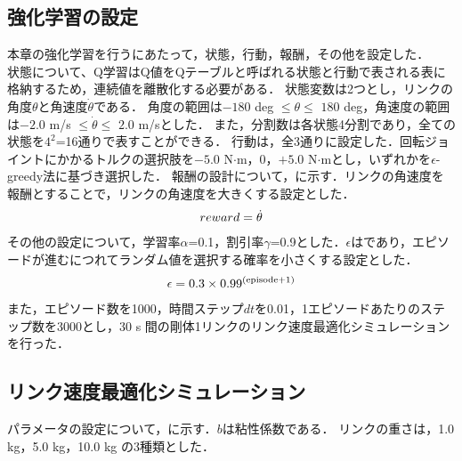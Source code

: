 \begin{small}
\subsection{強化学習の設定}
本章の強化学習を行うにあたって，状態，行動，報酬，その他を設定した．\\
状態について、Q学習はQ値をQテーブルと呼ばれる状態と行動で表される表に格納するため，連続値を離散化する必要がある．
状態変数は2つとし，リンクの角度$\theta$と角速度$\dot{\theta}$である．
角度の範囲は$-180$ deg $\leq \theta \leq$ $180$ deg，角速度の範囲は$-2.0$ m/s $\leq \dot{\theta} \leq$ $2.0$ m/sとした．
また，分割数は各状態4分割であり，全ての状態を$4^{2}$=16通りで表すことができる．
行動は，全3通りに設定した．回転ジョイントにかかるトルクの選択肢を$-5.0$ N$\cdot$m，$0$，$+5.0$ N$\cdot$mとし，いずれかを$\epsilon$-greedy法に基づき選択した．
報酬の設計について，に示す．リンクの角速度を報酬とすることで，リンクの角速度を大きくする設定とした．
\begin{eqnarray}
  \equlabel{3}
  reward = \dot{\theta}
\end{eqnarray}
その他の設定について，学習率$\alpha$=0.1，割引率$\gamma$=0.9とした．$\epsilon$はであり，エピソードが進むにつれてランダム値を選択する確率を小さくする設定とした．
\begin{eqnarray}
  \equlabel{4}
  \epsilon = 0.3 \times 0.99^{(\mathrm{episode} + 1)}
\end{eqnarray}
また，エピソード数を1000，時間ステップ$dt$を0.01，1エピソードあたりのステップ数を3000とし，30 s 間の剛体1リンクのリンク速度最適化シミュレーションを行った．
\subsection{リンク速度最適化シミュレーション}
パラメータの設定について，に示す．$b$は粘性係数である．
リンクの重さは，1.0 kg，5.0 kg，10.0 kg の3種類とした．

\end{small}
